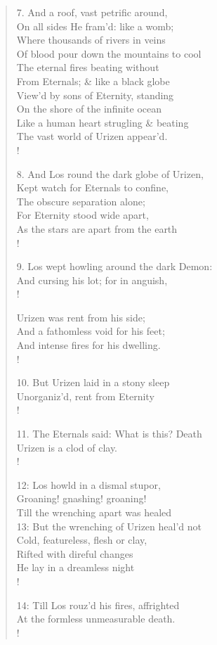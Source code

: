 \documentclass[9pt]{extarticle}
\begin{document}
\begin{verse}
\begin{altverse}
		7. And a roof, vast petrific around,\\
		On all sides He fram'd: like a womb;\\
		Where thousands of rivers in veins\\
		Of blood pour down the mountains to cool\\
		The eternal fires beating without\\
		From Eternals; \& like a black globe\\
		View'd by sons of Eternity, standing\\
		On the shore of the infinite ocean\\
		Like a human heart strugling \& beating\\
		The vast world of Urizen appear'd.\\!
		
		8. And Los round the dark globe of Urizen,\\
		Kept watch for Eternals to confine,\\
		The obscure separation alone;\\
		For Eternity stood wide apart,\\
		As the stars are apart from the earth\\!
		
		9. Los wept howling around the dark Demon:\\
		And cursing his lot; for in anguish,\\!
		
		Urizen was rent from his side;\\
		And a fathomless void for his feet;\\
		And intense fires for his dwelling.\\!
		
		10. But Urizen laid in a stony sleep\\
		Unorganiz'd, rent from Eternity\\!
		
		11. The Eternals said: What is this? Death\\
		Urizen is a clod of clay.\\!
		
		12: Los howld in a dismal stupor,\\
		Groaning! gnashing! groaning!\\
		Till the wrenching apart was healed\\
		13: But the wrenching of Urizen heal'd not\\
		Cold, featureless, flesh or clay,\\
		Rifted with direful changes\\
		He lay in a dreamless night\\!
		
		14: Till Los rouz'd his fires, affrighted\\
		At the formless unmeasurable death.\\!
		
\end{altverse}
\end{verse}	
\end{document}
